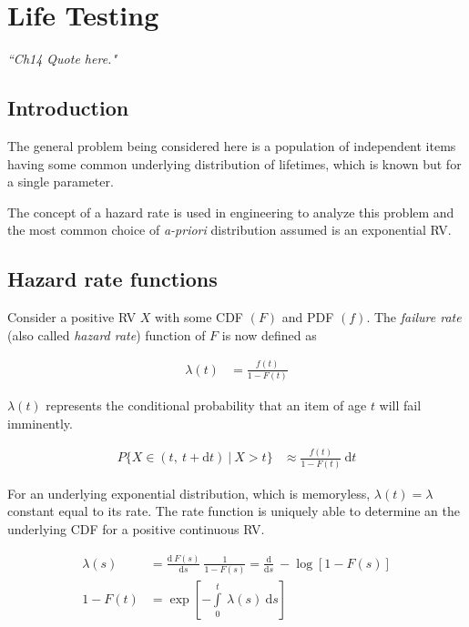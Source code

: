 \chapter{Life Testing}


\begin{flushright}
	\textit{``Ch14 Quote here."} \\
\end{flushright}

\section{Introduction}

The general problem being considered here is a population of independent items having some common underlying distribution of lifetimes, which is known but for a single parameter.

The concept of a hazard rate is used in engineering to analyze this problem and the most common choice of \textit{a-priori} distribution assumed is an exponential RV.

\section{Hazard rate functions}

Consider a positive RV $ X $ with some CDF $ (F) $ and PDF $ (f) $. The \textit{failure rate} (also called \textit{hazard rate}) function of $ F $ is now defined as

\begin{align}
	\lambda(t) &= \frac{f(t)}{1 - F(t)}
\end{align}

$ \lambda(t) $ represents the conditional probability that an item of age $ t $ will fail imminently.

\begin{align}
	P \{ X \in (t,\ t +\mathrm{d}t)\ |\ X > t \} &\approx \frac{f(t)}{1 - F(t)}\ \mathrm{d}t
\end{align}

For an underlying exponential distribution, which is memoryless, $ \lambda(t) = \lambda $ constant equal to its rate. The rate function is uniquely able to determine an the underlying CDF for a positive continuous RV.

\begin{align}
	\lambda(s) &= \frac{\mathrm{d}\ F(s)}{\mathrm{d}s}\ \frac{1}{1 - F(s)} = \frac{\mathrm{d}}{\mathrm{d}s}\ -\log \left[ 1 - F(s) \right] \\[1ex]
	1 - F(t) &= \exp\left[ -\int\limits_{0}^{t}\ \lambda(s)\ \mathrm{d}s \right]
\end{align}

